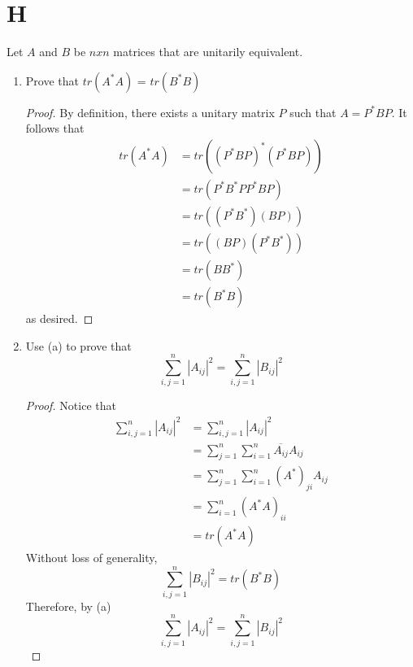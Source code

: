 \documentclass[11pt]{scrartcl}
\begin{document}
\section{H}
Let $A$ and $B$ be $nxn$ matrices that are unitarily equivalent.
\begin{enumerate}[label=\alph*.]
	\item {
	      Prove that $tr(A^*A)$ = $tr(B^*B)$
	      \begin{proof}
		      By definition, there exists a unitary matrix $P$ such that $A = P^*BP$. It follows that
		      \begin{align*}
			      tr(A^*A) & = tr((P^*BP)^*(P^*BP)) \\
			               & = tr(P^*B^*PP^*BP)     \\
			               & = tr((P^*B^*)(BP))     \\
			               & = tr((BP)(P^*B^*))     \\
			               & =  tr(BB^*)            \\
			               & =  tr(B^*B)
		      \end{align*}
		      as desired.
	      \end{proof}
	      }
	\item{
	      Use (a) to prove that
	      $$
		      \sum_{i, j=1}^{n}\left|A_{i j}\right|^{2}=\sum_{i, j=1}^{n}\left|B_{i j}\right|^{2}
	      $$
	      \begin{proof}
		      Notice that
		      \begin{align*}
			      \sum_{i, j=1}^{n}\left|A_{i j}\right|^{2} & = \sum_{i, j=1}^{n}|A_{i j}|^{2}                           \\
			                                                & = \sum_{j=1}^{n} \sum_{i=1}^{n} \overline{A_{i j}} A_{i j} \\
			                                                & = \sum_{j=1}^{n} \sum_{i=1}^{n} (A^{*})_{j i} A_{i j}      \\
			                                                & = \sum_{i=1}^{n} (A^{*}A)_{i i}                            \\
			                                                & = tr(A^*A)
		      \end{align*}
		      Without loss of generality,
		      $$\sum_{i, j=1}^{n}\left|B_{i j}\right|^{2} = tr(B^*B)$$
		      Therefore, by (a)
		      $$
			      \sum_{i, j=1}^{n}\left|A_{i j}\right|^{2}=\sum_{i, j=1}^{n}\left|B_{i j}\right|^{2}
		      $$
	      \end{proof}
}
\end{enumerate}
\end{document}
